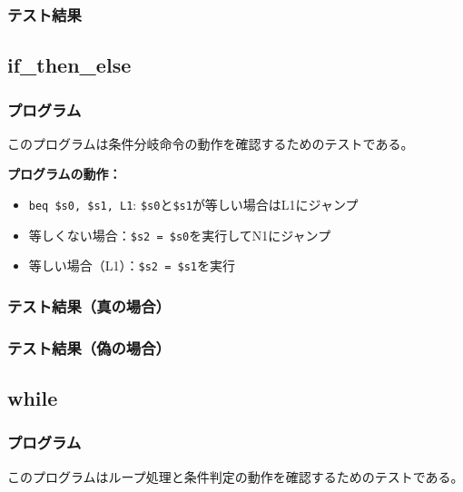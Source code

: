 \documentclass[dvipdfmx]{jsarticle}
\begin{document}
\subsubsection{テスト結果}


\subsection{if\_then\_else}
\label{appendix:if_then_else}

\subsubsection{プログラム}
このプログラムは条件分岐命令の動作を確認するためのテストである。



\textbf{プログラムの動作：}
\begin{itemize}
\item \texttt{beq \$s0, \$s1, L1}: \texttt{\$s0}と\texttt{\$s1}が等しい場合はL1にジャンプ
\item 等しくない場合：\texttt{\$s2 = \$s0}を実行してN1にジャンプ
\item 等しい場合（L1）：\texttt{\$s2 = \$s1}を実行
\end{itemize}

\subsubsection{テスト結果（真の場合）}


\subsubsection{テスト結果（偽の場合）}


\subsection{while}
\label{appendix:while}

\subsubsection{プログラム}
このプログラムはループ処理と条件判定の動作を確認するためのテストである。


\end{document}
